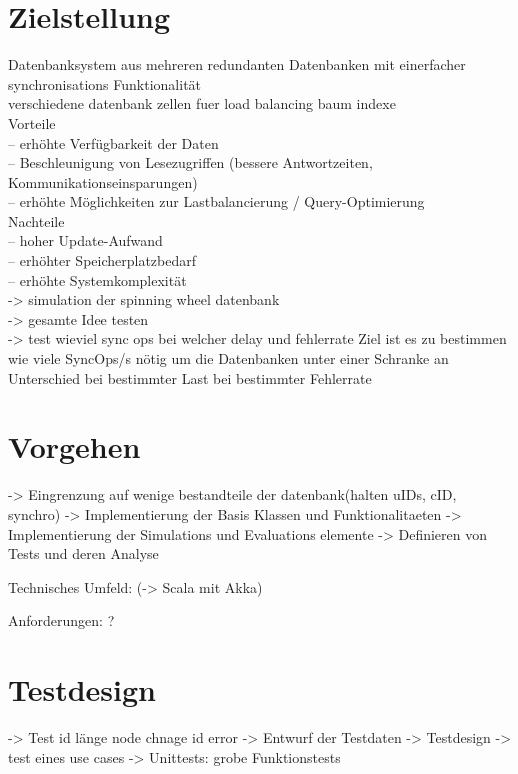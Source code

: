 \documentclass[a4paper,11pt,oneside,%
headsepline,												%
footsepline,												%
bibtotocnumbered									%
]{scrreprt}
\begin{document}
\section{Zielstellung}
Datenbanksystem aus mehreren redundanten Datenbanken mit einerfacher synchronisations Funktionalität\\

verschiedene datenbank zellen fuer load balancing
baum indexe\\

Vorteile\\
– erhöhte Verfügbarkeit der Daten\\
– Beschleunigung von Lesezugriffen (bessere Antwortzeiten,
Kommunikationseinsparungen)\\
– erhöhte Möglichkeiten zur Lastbalancierung / Query-Optimierung\\

Nachteile\\
– hoher Update-Aufwand\\
– erhöhter Speicherplatzbedarf\\
– erhöhte Systemkomplexität\\

-> simulation der spinning wheel datenbank\\
-> gesamte Idee testen\\
-> test wieviel sync ops bei welcher delay und fehlerrate
Ziel ist es zu bestimmen wie viele SyncOps/s nötig um die Datenbanken unter einer Schranke an Unterschied bei bestimmter Last bei bestimmter Fehlerrate

\section{Vorgehen}
-> Eingrenzung auf wenige bestandteile der datenbank(halten uIDs, cID, synchro)
-> Implementierung der Basis Klassen und Funktionalitaeten 
-> Implementierung der Simulations und Evaluations elemente
-> Definieren von Tests und deren Analyse

Technisches Umfeld:
(-> Scala mit Akka)

Anforderungen:
?

\section{Testdesign}
-> Test id länge node chnage id error
-> Entwurf der Testdaten
-> Testdesign -> test eines use cases
-> Unittests: grobe Funktionstests 


\end{document}
